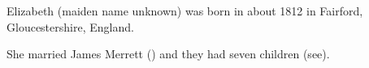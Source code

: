 
Elizabeth (maiden name unknown) was born in about 1812 in Fairford, Gloucestershire, England.\cite{Census1861Merrett}

She married James Merrett () and they had seven children (see).
